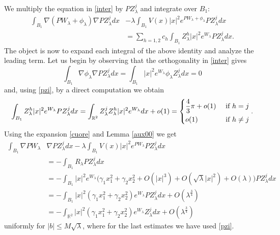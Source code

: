\documentclass[reqno,11pt]{amsart}
\theoremstyle{definition}
\numberwithin{equation}{section}
\newcommand{\intr}{\int_{\R^2}}
\newcommand{\R}{\mathbb{R}}
\newcommand{\la}{\lambda}
\newcommand{\into}{\int_{B_1}}
\renewcommand{\(}{\left(}
\renewcommand{\)}{\right)}
\renewcommand{\[}{\left[}
\renewcommand{\]}{\right]}
\newcommand{\beq}{\begin{equation}}
\newcommand{\eeq}{\end{equation}}
\begin{document}
{We multiply the equation in \eqref{inter} by   $PZ_\la^j$ and integrate over $B_1$:
\beq\label{masca}\begin{aligned}\into \nabla (PW_\la+\phi_{\la}) \nabla PZ^j_{\la} dx &-\la \into V(x) |x|^{2}e^{P W_\la+\phi_{\la}}PZ^j_{\la} dx\\&=\sum_{h=1,2}c_h \into Z_\la^h|x|^{2} e^{W_\la}PZ_\la^j dx.\end{aligned}
\eeq
The object  is now to expand each integral of the above identity and analyze the  leading term.
 Let us begin by observing that  the orthogonality in \eqref{inter} gives
\beq\label{masca1} \into \nabla \phi_{\la} \nabla PZ^j_{\la} dx =\into |x|^{2} e^{W_\la} \phi_{\la}Z_\la^j dx=0\eeq
and, using  \eqref{pzi}, by a direct computation we obtain\beq\label{masca2}\into Z_\la^h|x|^{2} e^{W_\la}PZ_\la^j dx= \intr Z_\la^jZ_\la^h|x|^{2} e^{W_\la}dx+o(1)=\left\{\begin{aligned}&\frac43 {\pi}+o(1) &\hbox{ if }h=j\\ &o(1)&\hbox{ if }h\neq j\end{aligned}\right..\eeq
Using the expansion \eqref{cuore}  and Lemma \ref{aux00} 
we get
\beq\label{coll}\begin{aligned}\int_{B_1} \nabla PW_\la &\nabla PZ^j_{\la} dx -\la \int_{B_1} V(x) |x|^{2}e^{P W_\la}PZ^j_{\la} dx\\ &=
-\int_{B_1} R_\la PZ^j_{\la} dx\\ &=
-\int_{B_1} |x|^{2}e^{W_\la} \Big(\gamma_1 x_1^2+\gamma_2 x_2^2+O(|x|^3)+O(\sqrt\la|x|^2)+O(\la) \Big)PZ^j_{\la} dx
\\ &= -\int_{B_1} |x|^{2}(\gamma_1 x_1^2+\gamma_2 x_2^2)e^{W_\la}PZ^j_{\la} dx+ O(\la^\frac34)
\\ &=-
\intr  |x|^{2}(\gamma_1 x_1^2+\gamma_2 x_2^2)e^{W_\la}Z^j_{\la} dx
+ O(\la^{\frac34})\end{aligned}\eeq uniformly for $|b|\leq M\sqrt\la$, where for the last estimates we have used \eqref{pzi}.

}
\end{document}
